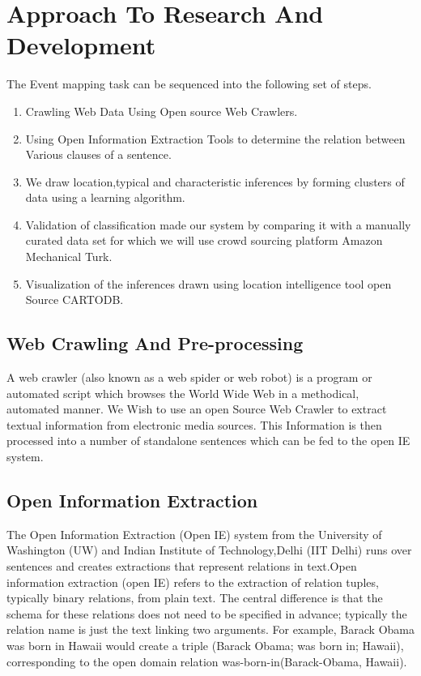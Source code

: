 \documentclass[a4paper,11pt]{article}
\begin{document}
\section{Approach To Research And Development}

The Event mapping task can be sequenced into the following set of steps.
\begin{enumerate}
 \item {Crawling Web Data Using Open source Web Crawlers.}
 \item {Using Open Information Extraction Tools to determine the relation between Various clauses of a sentence.} 
\item { We draw location,typical and characteristic inferences by forming clusters of data using a learning algorithm.} 
\item{ Validation of classification made our system by comparing it with a manually curated data set for which we will use crowd sourcing platform Amazon Mechanical Turk.}
\item { Visualization of the inferences drawn using location intelligence tool open Source CARTODB.}
\end{enumerate}

\subsection{Web Crawling And Pre-processing}
A web crawler (also known as a web spider or web robot) is a program or automated script which browses the World Wide Web in a methodical, automated manner. We Wish to use an open Source Web Crawler to extract textual information from electronic media sources. This Information is then processed into a number of standalone sentences which can be fed to the open IE system.

\subsection{Open Information Extraction}
The Open Information Extraction (Open IE) \cite{openIE} system from the University of Washington (UW) and Indian Institute of Technology,Delhi (IIT Delhi) runs over sentences and creates extractions that represent relations in text.Open information extraction (open IE) refers to the extraction of relation tuples, typically binary relations, from plain text. The central difference is that the schema for these relations does not need to be specified in advance; typically the relation name is just the text linking two arguments. For example, Barack Obama was born in Hawaii would create a triple (Barack Obama; was born in; Hawaii), corresponding to the open domain relation was-born-in(Barack-Obama, Hawaii).
\end{document}
